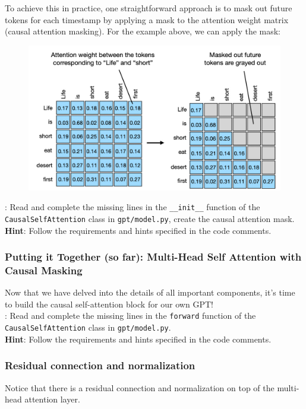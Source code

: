 To achieve this in practice, one straightforward approach is to mask out future tokens for each timestamp by applying a mask to the attention weight matrix (causal attention masking). For the example above, we can apply the mask:
\begin{figure}[ht]
    \centering
    \includegraphics[scale=0.2]{figures/causal_attn_mask.jpg}
\end{figure}

\noindent\todo{}: Read and complete the missing lines in the \texttt{\_\_init\_\_} function of the \texttt{CausalSelfAttention} class in \texttt{gpt/model.py}, create the causal attention mask.\\
\noindent\textbf{Hint}: Follow the requirements and hints specified in the code comments.

\subsubsection{Putting it Together (so far): Multi-Head Self Attention with Causal Masking}
Now that we have delved into the details of all important components, it's time to build the causal self-attention block for our own GPT!\\

\noindent\todo{}: Read and complete the missing lines in the \texttt{forward} function of the \texttt{CausalSelfAttention} class in \texttt{gpt/model.py}.\\
\noindent\textbf{Hint}: Follow the requirements and hints specified in the code comments.


\subsubsection{Residual connection and normalization}
Notice that there is a residual connection and normalization on top of the multi-head attention layer.

